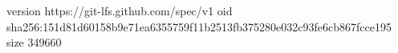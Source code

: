 version https://git-lfs.github.com/spec/v1
oid sha256:151d81d60158b9e71ea6355759f11b2513fb375280e032c93fe6cb867fcce195
size 349660
